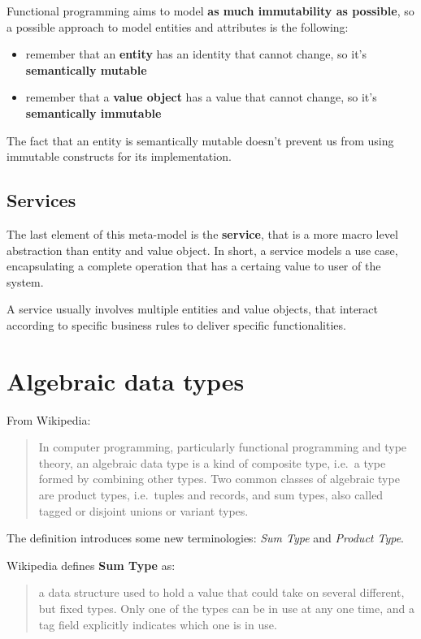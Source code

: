 Functional programming aims to model \textbf{as much immutability as
possible}, so a possible approach to model entities and attributes is
the following:

\begin{itemize}
\itemsep1pt\parskip0pt
\item
  remember that an \textbf{entity} has an identity that cannot change,
  so it's \textbf{semantically mutable}
\item
  remember that a \textbf{value object} has a value that cannot change,
  so it's \textbf{semantically immutable}
\end{itemize}

The fact that an entity is semantically mutable doesn't prevent us from
using immutable constructs for its implementation.

\subsection{Services}\label{services}

The last element of this meta-model is the \textbf{service}, that is a
more macro level abstraction than entity and value object. In short, a
service models a use case, encapsulating a complete operation that has a
certaing value to user of the system.

A service usually involves multiple entities and value objects, that
interact according to specific business rules to deliver specific
functionalities.


\section{Algebraic data types}\label{algebraic-data-types}

From Wikipedia:

\begin{quote}
In computer programming, particularly functional programming and type
theory, an algebraic data type is a kind of composite type, i.e.~a type
formed by combining other types. Two common classes of algebraic type
are product types, i.e.~tuples and records, and sum types, also called
tagged or disjoint unions or variant types.
\end{quote}

The definition introduces some new terminologies: \emph{Sum Type} and
\emph{Product Type}.

Wikipedia defines \textbf{Sum Type} as:

\begin{quote}
a data structure used to hold a value that could take on several
different, but fixed types. Only one of the types can be in use at any
one time, and a tag field explicitly indicates which one is in use.
\end{quote}

